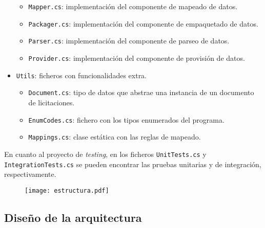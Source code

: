 \begin{itemize}
                \begin{itemize}
                    \item \texttt{Mapper.cs}: implementación del componente de mapeado de datos.
                    \item \texttt{Packager.cs}: implementación del componente de empaquetado de datos.
                    \item \texttt{Parser.cs}: implementación del componente de parseo de datos.
                    \item \texttt{Provider.cs}: implementación del componente de provisión de datos.
                \end{itemize}
            \item \texttt{Utils}: ficheros con funcionalidades extra.
                \begin{itemize}
                    \item \texttt{Document.cs}: tipo de datos que abstrae una instancia de un documento de licitaciones.
                    \item \texttt{EnumCodes.cs}: fichero con los tipos enumerados del programa.
                    \item \texttt{Mappings.cs}: clase estática con las reglas de mapeado.
                \end{itemize}
        \end{itemize}
        
        En cuanto al proyecto de \textit{testing}, en los ficheros \texttt{UnitTests.cs} y \texttt{IntegrationTests.cs} se pueden encontrar las pruebas unitarias y de integración, respectivamente.
        
        \begin{figure}[h]
            \centering
            \texttt{[image: estructura.pdf]}
            \label{fig:estructura}
        \end{figure}
        
    \subsection{Diseño de la arquitectura}
